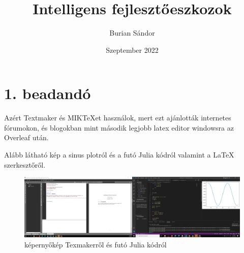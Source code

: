 \documentclass{article}
\title{Intelligens fejlesztőeszkozok}
\author{Burian Sándor}
\date{Szeptember 2022}
\begin{document}
\maketitle

\section{1. beadandó}

Azért Textmaker és MIKTeXet használok, mert ezt ajánlották internetes fórumokon, és blogokban mint második legjobb latex editor windowsra az Overleaf után.

Alább látható kép a sinus plotról és a futó Julia kódról valamint a LaTeX szerkesztőről.
\begin{figure}
    \centering
	\includegraphics[width=15cm]{kepernyokep_ujra.png} 
    \caption{képernyőkép Texmakerről és futó Julia kódról}
    \label{fig:képernyőkép Texmakerről és futó Julia kódról}
\end{figure}
\end{document}
